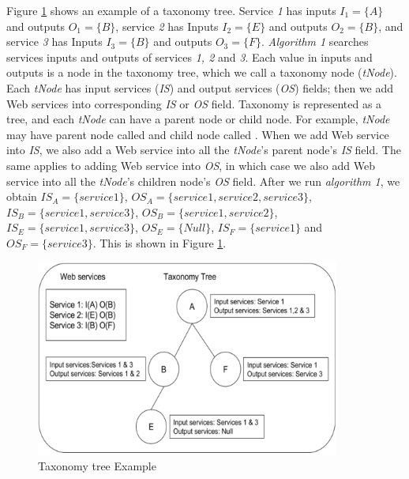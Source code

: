 \begin{exmp}
Figure \ref{fig:taxonomyTree} shows an example of a taxonomy tree. Service \emph{1} has inputs $I_1 = \{A\}$ and outputs $O_1 = \{B\}$, service \emph{2} has Inputs $I_2 = \{E\}$  and outputs $O_2 = \{B\}$, and service \emph{3} has Inputs $I_3 = \{B\}$  and outputs $O_3 = \{F\}$. \emph{Algorithm 1} searches services inputs and outputs of services \emph{1, 2} and \emph{3}. Each value in inputs and outputs is a node in the taxonomy tree, which we call a taxonomy node (\emph{tNode}). Each \emph{tNode} has input services (\emph{IS}) and output services (\emph{OS}) fields; then we add Web services into corresponding \emph{IS} or \emph{OS} field. Taxonomy is represented as a tree, and each \emph{tNode} can have a parent node or child node. For example,  \emph{tNode} may have parent node called  and child node called . When we add Web service into \emph{IS}, we also add a Web service into all the \emph{tNode}'s parent node's \emph{IS} field. The same applies to adding Web service into \emph{OS}, in which case we also add Web service into all the \emph{tNode}'s children node's \emph{OS} field. After we run \emph{algorithm 1}, we obtain $IS_A = \{service 1\}$, $OS_A = \{service 1, service 2, service 3\}$, $IS_B = \{service 1, service 3\}$, $OS_B = \{service 1, service 2\}$, $IS_E = \{service 1, service 3\}$, $OS_E = \{Null\}$, $IS_F = \{service 1\}$ and $OS_F = \{service 3\}$. This is shown in Figure \ref{fig:taxonomyTree}. \par
\end{exmp}

\begin{figure}[H]
\includegraphics[width = 10cm]{taxonomy-tree-example.pdf}
\centering
\caption{Taxonomy tree Example}
\label{fig:taxonomyTree} 
\end{figure} 

